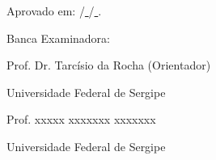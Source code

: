 \begin{titlepage}
\begin{center}
        \centerline{Aprovado em: \underline{ }\underline{ }\underline{ }\underline{ }\underline{ }\underline{ } /\underline{ }\underline{ }\underline{ }\underline{ }\underline{ }\underline{ } /\underline{ }\underline{ }\underline{ }\underline{ }\underline{ }\underline{ }.}
        \centerline{}
        \centerline{}
        \centerline{Banca Examinadora:}

        \centerline{}
        \centerline{\underline{ }\underline{ }\underline{ }\underline{ }\underline{ }\underline{ }\underline{ }\underline{ }\underline{ }\underline{ }\underline{ }\underline{ }\underline{ }\underline{ }\underline{ }\underline{ }\underline{ }\underline{ }\underline{ }\underline{ }\underline{ }\underline{ }\underline{ }\underline{ }\underline{ }\underline{ }\underline{ }\underline{ }\underline{ }\underline{ }\underline{ }\underline{ }\underline{ }\underline{ }\underline{ }\underline{ }\underline{ }\underline{ }\underline{ }\underline{ }\underline{ }\underline{ }\underline{ }\underline{ }\underline{ }\underline{ }\underline{ }\underline{ }\underline{ }\underline{ }\underline{ }\underline{ }\underline{ }\underline{ }\underline{ }\underline{ }\underline{ }\underline{ }\underline{ }\underline{ }\underline{ }\underline{ }\underline{ }\underline{ }\underline{ }\underline{ }\underline{ }\underline{ }\underline{ }\underline{ }\underline{ }\underline{ }\underline{ }\underline{ }\underline{ }\underline{ }\underline{ }}
        \centerline{Prof. Dr. Tarc\'isio da Rocha (Orientador)}
        \centerline{Universidade Federal de Sergipe}
        \centerline{}

        \centerline{\underline{ }\underline{ }\underline{ }\underline{ }\underline{ }\underline{ }\underline{ }\underline{ }\underline{ }\underline{ }\underline{ }\underline{ }\underline{ }\underline{ }\underline{ }\underline{ }\underline{ }\underline{ }\underline{ }\underline{ }\underline{ }\underline{ }\underline{ }\underline{ }\underline{ }\underline{ }\underline{ }\underline{ }\underline{ }\underline{ }\underline{ }\underline{ }\underline{ }\underline{ }\underline{ }\underline{ }\underline{ }\underline{ }\underline{ }\underline{ }\underline{ }\underline{ }\underline{ }\underline{ }\underline{ }\underline{ }\underline{ }\underline{ }\underline{ }\underline{ }\underline{ }\underline{ }\underline{ }\underline{ }\underline{ }\underline{ }\underline{ }\underline{ }\underline{ }\underline{ }\underline{ }\underline{ }\underline{ }\underline{ }\underline{ }\underline{ }\underline{ }\underline{ }\underline{ }\underline{ }\underline{ }\underline{ }\underline{ }\underline{ }\underline{ }\underline{ }\underline{ }}
        \centerline{Prof. xxxxx xxxxxxx xxxxxxx}
        \centerline{Universidade Federal de Sergipe}
        \centerline{}


\end{center}
\end{titlepage}
